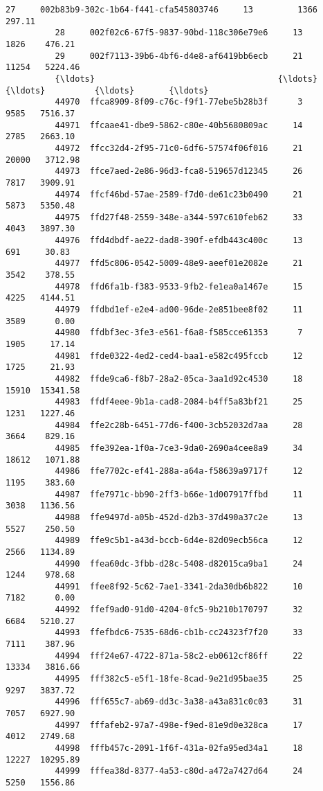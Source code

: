 \documentclass[11pt]{article}
\begin{document}
\begin{Verbatim}[commandchars=\\\{\}]
          27     002b83b9-302c-1b64-f441-cfa545803746     13         1366    297.11   
          28     002f02c6-67f5-9837-90bd-118c306e79e6     13         1826    476.21   
          29     002f7113-39b6-4bf6-d4e8-af6419bb6ecb     21        11254   5224.46   
          {\ldots}                                     {\ldots}    {\ldots}          {\ldots}       {\ldots}   
          44970  ffca8909-8f09-c76c-f9f1-77ebe5b28b3f      3         9585   7516.37   
          44971  ffcaae41-dbe9-5862-c80e-40b5680809ac     14         2785   2663.10   
          44972  ffcc32d4-2f95-71c0-6df6-57574f06f016     21        20000   3712.98   
          44973  ffce7aed-2e86-96d3-fca8-519657d12345     26         7817   3909.91   
          44974  ffcf46bd-57ae-2589-f7d0-de61c23b0490     21         5873   5350.48   
          44975  ffd27f48-2559-348e-a344-597c610feb62     33         4043   3897.30   
          44976  ffd4dbdf-ae22-dad8-390f-efdb443c400c     13          691     30.83   
          44977  ffd5c806-0542-5009-48e9-aeef01e2082e     21         3542    378.55   
          44978  ffd6fa1b-f383-9533-9fb2-fe1ea0a1467e     15         4225   4144.51   
          44979  ffdbd1ef-e2e4-ad00-96de-2e851bee8f02     11         3589      0.00   
          44980  ffdbf3ec-3fe3-e561-f6a8-f585cce61353      7         1905     17.14   
          44981  ffde0322-4ed2-ced4-baa1-e582c495fccb     12         1725     21.93   
          44982  ffde9ca6-f8b7-28a2-05ca-3aa1d92c4530     18        15910  15341.58   
          44983  ffdf4eee-9b1a-cad8-2084-b4ff5a83bf21     25         1231   1227.46   
          44984  ffe2c28b-6451-77d6-f400-3cb52032d7aa     28         3664    829.16   
          44985  ffe392ea-1f0a-7ce3-9da0-2690a4cee8a9     34        18612   1071.88   
          44986  ffe7702c-ef41-288a-a64a-f58639a9717f     12         1195    383.60   
          44987  ffe7971c-bb90-2ff3-b66e-1d007917ffbd     11         3038   1136.56   
          44988  ffe9497d-a05b-452d-d2b3-37d490a37c2e     13         5527    250.50   
          44989  ffe9c5b1-a43d-bccb-6d4e-82d09ecb56ca     12         2566   1134.89   
          44990  ffea60dc-3fbb-d28c-5408-d82015ca9ba1     24         1244    978.68   
          44991  ffee8f92-5c62-7ae1-3341-2da30db6b822     10         7182      0.00   
          44992  ffef9ad0-91d0-4204-0fc5-9b210b170797     32         6684   5210.27   
          44993  ffefbdc6-7535-68d6-cb1b-cc24323f7f20     33         7111    387.96   
          44994  fff24e67-4722-871a-58c2-eb0612cf86ff     22        13334   3816.66   
          44995  fff382c5-e5f1-18fe-8cad-9e21d95bae35     25         9297   3837.72   
          44996  fff655c7-ab69-dd3c-3a38-a43a831c0c03     31         7057   6927.90   
          44997  fffafeb2-97a7-498e-f9ed-81e9d0e328ca     17         4012   2749.68   
          44998  fffb457c-2091-1f6f-431a-02fa95ed34a1     18        12227  10295.89   
          44999  fffea38d-8377-4a53-c80d-a472a7427d64     24         5250   1556.86   
          

\end{Verbatim}
\end{document}
